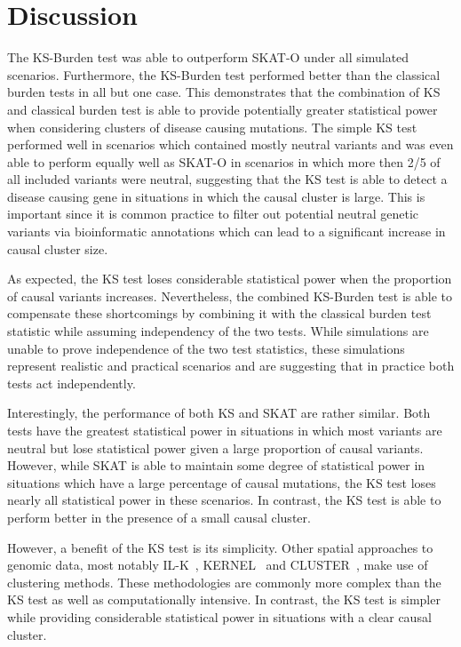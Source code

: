 \section{Discussion}
\label{sec:discussion_ks}

The KS-Burden test was able to outperform SKAT-O under all simulated scenarios.
Furthermore, the KS-Burden test performed better than the classical burden tests in all but one case.
This demonstrates that the combination of KS and classical burden test is able to provide potentially greater statistical power when considering clusters of disease causing mutations.
The simple KS test performed well in scenarios which contained mostly neutral variants and was even able to perform equally well as SKAT-O in scenarios in which more then 2/5 of all included variants were neutral, suggesting that the KS test is able to detect a disease causing gene in situations in which the causal cluster is large.
This is important since it is common practice to filter out potential neutral genetic variants via bioinformatic annotations which can lead to a significant increase in causal cluster size.

As expected, the KS test loses considerable statistical power when the proportion of causal variants increases.
Nevertheless, the combined KS-Burden test is able to compensate these shortcomings by combining it with the classical burden test statistic while assuming independency of the two tests.
While simulations are unable to prove independence of the two test statistics, these simulations represent realistic and practical scenarios and are suggesting that in practice both tests act independently.

Interestingly, the performance of both KS and SKAT are rather similar.
Both tests have the greatest statistical power in situations in which most variants are neutral but lose statistical power given a large proportion of causal variants.
However, while SKAT is able to maintain some degree of statistical power in situations which have a large percentage of causal mutations, the KS test loses nearly all statistical power in these scenarios.
In contrast, the KS test is able to perform better in the presence of a small causal cluster.

However, a benefit of the KS test is its simplicity.
Other spatial approaches to genomic data, most notably IL-K~\cite{Ionita-Laza2012}, KERNEL~\cite{Schaid2013} and CLUSTER~\cite{Lin2014}, make use of clustering methods.
These methodologies are commonly more complex than the KS test as well as computationally intensive.
In contrast, the KS test is simpler while providing considerable statistical power in situations with a clear causal cluster.

